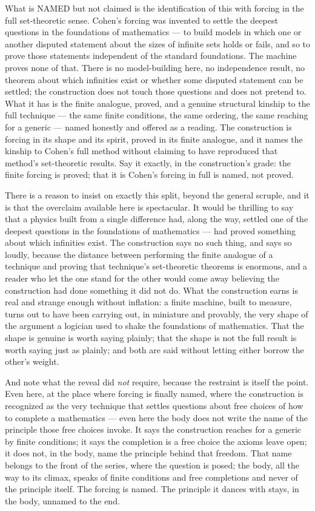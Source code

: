 What is NAMED but not claimed is the identification of this with forcing in the full set-theoretic sense. Cohen's
forcing was invented to settle the deepest questions in the foundations of mathematics --- to build models in
which one or another disputed statement about the sizes of infinite sets holds or fails, and so to prove those
statements independent of the standard foundations. The machine proves none of that. There is no model-building
here, no independence result, no theorem about which infinities exist or whether some disputed statement can be
settled; the construction does not touch those questions and does not pretend to. What it has is the finite
analogue, proved, and a genuine structural kinship to the full technique --- the same finite conditions, the same
ordering, the same reaching for a generic --- named honestly and offered as a reading. The construction is forcing
in its shape and its spirit, proved in its finite analogue, and it names the kinship to Cohen's full method
without claiming to have reproduced that method's set-theoretic results. Say it exactly, in the construction's grade: the
finite forcing is proved; that it is Cohen's forcing in full is named, not proved.

There is a reason to insist on exactly this split, beyond the general scruple, and it is that the overclaim
available here is spectacular. It would be thrilling to say that a physics built from a single difference had,
along the way, settled one of the deepest questions in the foundations of mathematics --- had proved something
about which infinities exist. The construction says no such thing, and says so loudly, because the distance between
performing the finite analogue of a technique and proving that technique's set-theoretic theorems is enormous, and
a reader who let the one stand for the other would come away believing the construction had done something it did not
do. What the construction earns is real and strange enough without inflation: a finite machine, built to measure,
turns out to have been carrying out, in miniature and provably, the very shape of the argument a logician used to
shake the foundations of mathematics. That the shape is genuine is worth saying plainly; that the shape is not the
full result is worth saying just as plainly; and both are said without letting either borrow the other's weight.

And note what the reveal did \emph{not} require, because the restraint is itself the point. Even here, at the
place where forcing is finally named, where the construction is recognized as the very technique that settles
questions about free choices of how to complete a mathematics --- even here the body does not write the name of
the principle those free choices invoke. It says the construction reaches for a generic by finite conditions; it
says the completion is a free choice the axioms leave open; it does not, in the body, name the principle behind
that freedom. That name belongs to the front of the series, where the question is posed; the body, all the way to
its climax, speaks of finite conditions and free completions and never of the principle itself. The forcing is
named. The principle it dances with stays, in the body, unnamed to the end.

